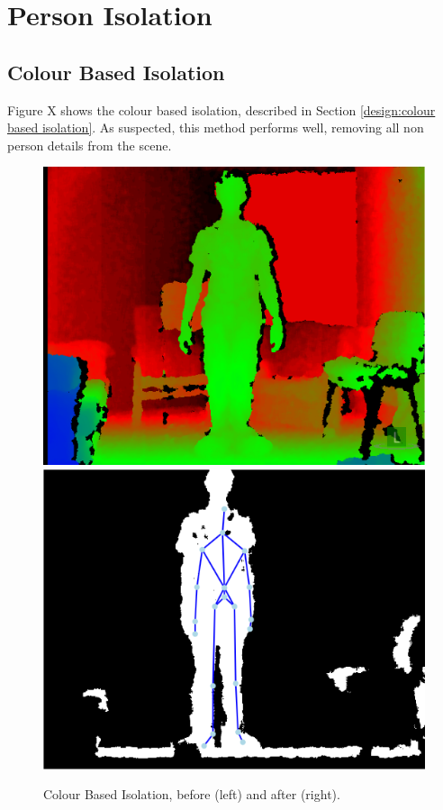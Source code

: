 \section{Person Isolation}
\label{testing:person isolation}

\subsection{Colour Based Isolation}
\label{testing:colour based isolation}
Figure X shows the colour based isolation, described in Section \ref{design:colour based isolation}.
As suspected, this method performs well, removing all non person  details from the scene.\\

\begin{figure}[h]
\begin{center}
\includegraphics[scale=0.4]{./testing/parse1} 
\includegraphics[scale=0.4]{./testing/parse2}
\end{center}
\caption{Colour Based Isolation, before (left) and after (right).}
\label{fig:colour based cut off}
\end{figure} 

